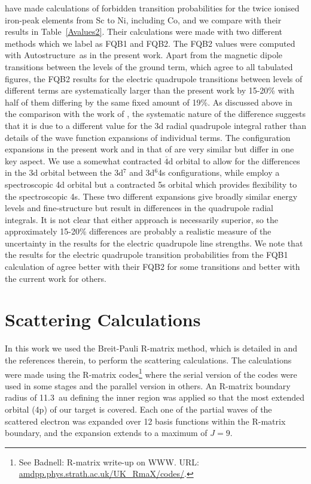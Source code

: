 \documentclass[useAMS,usenatbib]{mn2e}
\newcommand{\AS}    {{\sc Autostructure}}
\newcommand{\ps} [1]{\overline{#1}}
\begin{document}
\citet{FivetQB2016} have made calculations of forbidden transition probabilities for the twice
ionised iron-peak elements from Sc to Ni, including Co, and we compare with their results in
Table~\ref{Avalues2}. Their calculations were made with two different methods which we label as
FQB1 and FQB2. The FQB2 values were computed with \AS\ as in the present work. Apart from the
magnetic dipole transitions between the levels of the ground term, which agree to all tabulated
figures, the FQB2 results for the electric quadrupole transitions between levels of different terms
are systematically larger than the present work by 15-20\% with half of them differing by the same
fixed amount of 19\%. As discussed above in the comparison with the work of \citet{HansenRU1984},
the systematic nature of the difference suggests that it is due to a different value for the 3d
radial quadrupole integral rather than details of the wave function expansions of individual terms.
The configuration expansions in the present work and in that of \citet{FivetQB2016} are very
similar but differ in one key aspect. We use a somewhat contracted $\ps4$d orbital to allow for the
differences in the 3d orbital between the 3d$^7$ and 3d$^6$4s configurations, while
\citet{FivetQB2016} employ a spectroscopic 4d orbital but a contracted 5s orbital which provides
flexibility to the spectroscopic 4s. These two different expansions give broadly similar energy
levels and fine-structure but result in differences in the quadrupole radial integrals. It is not
clear that either approach is necessarily superior, so the approximately 15-20\% differences are
probably a realistic measure of the uncertainty in the results for the electric quadrupole line
strengths. We note that the results for the electric quadrupole transition probabilities from the
FQB1 calculation of \citet{FivetQB2016} agree better with their FQB2 for some transitions and
better with the current work for others.

\section{Scattering Calculations} \label{Scattering}

In this work we used the Breit-Pauli R-matrix method, which is detailed in \citet{HummerBEPST1993,
BerringtonEN1995} and the references therein, to perform the scattering calculations. The
calculations were made using the R-matrix codes\footnote{{See Badnell: R-matrix write-up on WWW.
URL: \url{amdpp.phys.strath.ac.uk/UK_RmaX/codes/}.}} where the serial version of the codes were
used in some stages and the parallel version in others. An R-matrix boundary radius of 11.3~au
defining the inner region was applied so that the most extended orbital (4p) of our target is
covered. Each one of the partial waves of the scattered electron was expanded over 12 basis
functions within the R-matrix boundary, and the expansion extends to a maximum of $J=9$.
\end{document}
